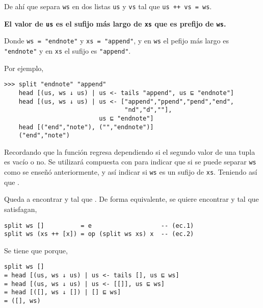 \inputminted{haskell}{definiciones/kmp/1-down-arrow.hs}

De ahí que  separa \texttt{ws} en dos listas \texttt{us} y \texttt{vs} tal que
\texttt{us ++ vs = ws}.

\begin{center}
\textbf{El valor de \texttt{us} es el sufijo más largo de \texttt{xs} que es prefijo de \texttt{ws}.}
\end{center}

Donde \texttt{ws = "{}endnote"} y \texttt{xs = "{}append"}, y en \texttt{ws} el pefijo más largo
es \texttt{"\color{purple}{}end\color{black}note"} y en \texttt{xs} el sufijo es
\texttt{"{}app\color{purple}end\color{black}"}.

Por ejemplo,
\begin{verbatim}
>>> split "endnote" "append"
    head [(us, ws ↓ us) | us <- tails "append", us ⊑ "endnote"]
    head [(us, ws ↓ us) | us <- ["append","ppend","pend","end",
                                 "nd","d",""],
                          us ⊑ "endnote"]
    head [("end","note"), ("","endnote")]
    ("end","note")
\end{verbatim}

Recordando que la función  regresa  dependiendo si el segundo valor
de una tupla es vacío o no. Se utilizará compuesta con  para indicar que si se
puede separar \texttt{ws} como se enseñó anteriormente, y así indicar si \texttt{ws} es un sufijo
de \texttt{xs}. Teniendo así que .

Queda a encontrar  y  tal que . De forma
equivalente, se quiere encontrar  y  tal que satisfagan, 

\begin{verbatim}
split ws []          = e                   -- (ec.1)
split ws (xs ++ [x]) = op (split ws xs) x  -- (ec.2)
\end{verbatim}

Se tiene que  porque, 
\begin{verbatim}
split ws []
= head [(us, ws ↓ us) | us <- tails [], us ⊑ ws]
= head [(us, ws ↓ us) | us <- [[]], us ⊑ ws]
= head [([], ws ↓ []) | [] ⊑ ws]
= ([], ws)
\end{verbatim}

